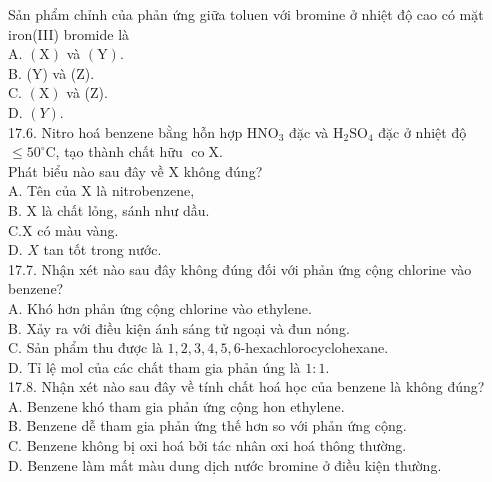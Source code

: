 \documentclass[10pt]{article}
\begin{document}
Sản phẩm chỉnh của phản ứng giữa toluen với bromine ở nhiệt độ cao có mặt iron(III) bromide là\\
A. $(\mathrm{X})$ và $(\mathrm{Y})$.\\
B. (Y) và (Z).\\
C. $(\mathrm{X})$ và (Z).\\
D. $(Y)$.\\
17.6. Nitro hoá benzene bằng hỗn hợp $\mathrm{HNO}_{3}$ đặc và $\mathrm{H}_{2} \mathrm{SO}_{4}$ đặc ở nhiệt độ $\leq 50^{\circ} \mathrm{C}$, tạo thành chất hữu $\operatorname{co} \mathrm{X}$.\\
Phát biểu nào sau đây về X không đúng?\\
A. Tên của X là nitrobenzene,\\
B. X là chất lỏng, sánh như dầu.\\
$\mathrm{C} . \mathrm{X}$ có màu vàng.\\
D. $X$ tan tốt trong nước.\\
17.7. Nhận xét nào sau đây không đúng đối với phản ứng cộng chlorine vào benzene?\\
A. Khó hơn phản ứng cộng chlorine vào ethylene.\\
B. Xảy ra với điều kiện ánh sáng tử ngoại và đun nóng.\\
C. Sản phẩm thu được là $1,2,3,4,5,6$-hexachlorocyclohexane.\\
D. Tỉ lệ mol của các chất tham gia phản úng là $1: 1$.\\
17.8. Nhận xét nào sau đây về tính chất hoá học của benzene là không đúng?\\
A. Benzene khó tham gia phản ứng cộng hon ethylene.\\
B. Benzene dễ tham gia phản ứng thế hơn so với phản ứng cộng.\\
C. Benzene không bị oxi hoá bởi tác nhân oxi hoá thông thường.\\
D. Benzene làm mất màu dung dịch nước bromine ở điều kiện thường.
\end{document}
